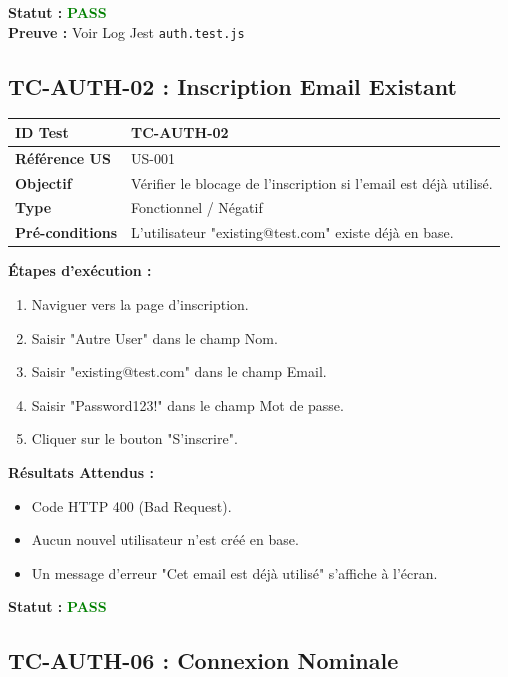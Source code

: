 \documentclass[12pt,a4paper]{article}
\begin{document}
\textbf{Statut :} \textcolor{green}{\textbf{PASS}} \\
\textbf{Preuve :} Voir Log Jest \texttt{auth.test.js}

\subsection{TC-AUTH-02 : Inscription Email Existant}

\begin{tabular}{|l|p{10cm}|}
    \hline
    \textbf{ID Test} & TC-AUTH-02 \\ \hline
    \textbf{Référence US} & US-001 \\ \hline
    \textbf{Objectif} & Vérifier le blocage de l'inscription si l'email est déjà utilisé. \\ \hline
    \textbf{Type} & Fonctionnel / Négatif \\ \hline
    \textbf{Pré-conditions} & L'utilisateur "existing@test.com" existe déjà en base. \\ \hline
\end{tabular}

\vspace{0.5cm}
\textbf{Étapes d'exécution :}
\begin{enumerate}
    \item Naviguer vers la page d'inscription.
    \item Saisir "Autre User" dans le champ Nom.
    \item Saisir "existing@test.com" dans le champ Email.
    \item Saisir "Password123!" dans le champ Mot de passe.
    \item Cliquer sur le bouton "S'inscrire".
\end{enumerate}

\vspace{0.5cm}
\textbf{Résultats Attendus :}
\begin{itemize}
    \item Code HTTP 400 (Bad Request).
    \item Aucun nouvel utilisateur n'est créé en base.
    \item Un message d'erreur "Cet email est déjà utilisé" s'affiche à l'écran.
\end{itemize}

\vspace{0.5cm}
\textbf{Statut :} \textcolor{green}{\textbf{PASS}}

\subsection{TC-AUTH-06 : Connexion Nominale}
\end{document}
